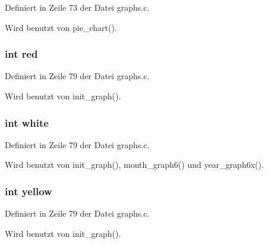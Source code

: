 Definiert in Zeile 73 der Datei graphs.c.

Wird benutzt von pie\_\-chart().
\subsubsection{\setlength{\rightskip}{0pt plus 5cm}int {\bf red}}\label{graphs_8c_6761340706096510fd89edca40a63b9b}




Definiert in Zeile 79 der Datei graphs.c.

Wird benutzt von init\_\-graph().
\subsubsection{\setlength{\rightskip}{0pt plus 5cm}int {\bf white}}\label{graphs_8c_52b8a1dc217164197e6e5ba60ec911bf}




Definiert in Zeile 79 der Datei graphs.c.

Wird benutzt von init\_\-graph(), month\_\-graph6() und year\_\-graph6x().
\subsubsection{\setlength{\rightskip}{0pt plus 5cm}int {\bf yellow}}\label{graphs_8c_34167711871149458e41ef5d3e3541fe}




Definiert in Zeile 79 der Datei graphs.c.

Wird benutzt von init\_\-graph().